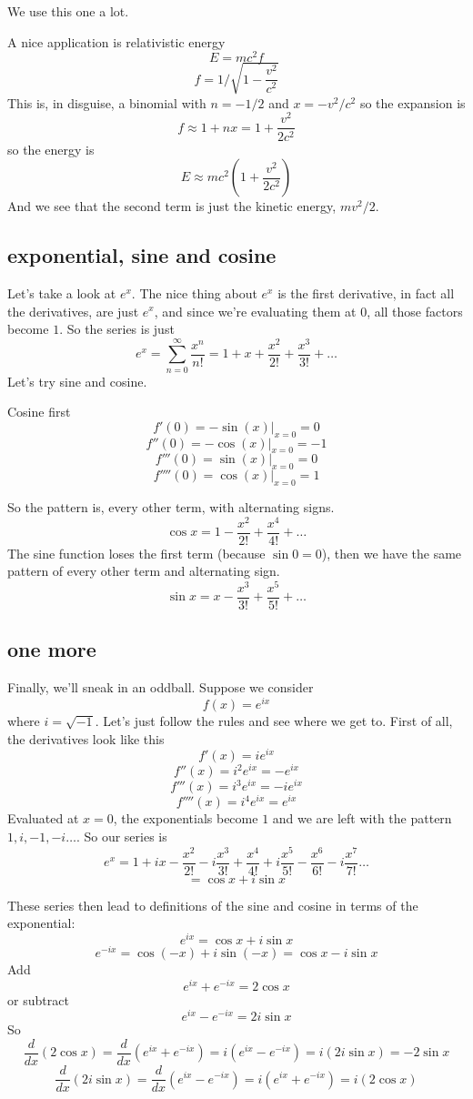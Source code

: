 \documentclass[11pt, oneside]{article}
\begin{document}
We use this one a lot.

A nice application is relativistic energy
\[ E = mc^2 f \]
\[ f =  1/\sqrt{1-\frac{v^2}{c^2}} \]
This is, in disguise, a binomial with $n=-1/2$ and $x=-v^2/c^2$ so the expansion is
\[ f  \approx 1 + nx = 1 + \frac{v^2}{2c^2} \]
so the energy is 
\[ E \approx mc^2 (1 + \frac{v^2}{2c^2} ) \]
And we see that the second term is just the kinetic energy, $mv^2/2$.

\subsection*{exponential, sine and cosine}
Let's take a look at $e^x$.  The nice thing about $e^x$ is the first derivative, in fact all the derivatives, are just $e^x$, and since we're evaluating them at $0$, all those factors become $1$.  So the series is just
\[ e^x = \sum_{n=0}^{\infty} \frac{x^n}{n!} = 1 + x + \frac{x^2}{2!} + \frac{x^3}{3!} + \dots \]
Let's try sine and cosine.  

Cosine first
\[ f'(0) = -\sin(x) \bigg |_{x=0} = 0 \]
\[ f''(0) = -\cos(x) \bigg |_{x=0} = -1 \]
\[ f'''(0) = \sin(x) \bigg |_{x=0} = 0 \]
\[ f''''(0) = \cos(x) \bigg |_{x=0} = 1 \]

So the pattern is, every other term, with alternating signs.
\[ \cos x = 1 - \frac{x^2}{2!} + \frac{x^4}{4!} + \dots \]
The sine function loses the first term (because $\sin 0 = 0$), then we have the same pattern of every other term and alternating sign.
\[ \sin x = x - \frac{x^3}{3!} + \frac{x^5}{5!} + \dots \]


\subsection*{one more}
Finally, we'll sneak in an oddball.  Suppose we consider
\[ f(x) = e^{ix} \]
where $i = \sqrt{-1}$.  Let's just follow the rules and see where we get to.  First of all, the derivatives look like this
\[ f'(x) = ie^{ix} \]
\[ f''(x) = i^2e^{ix} = -e^{ix} \]
\[ f'''(x) = i^3e^{ix} = -ie^{ix} \]
\[ f''''(x) = i^4e^{ix} = e^{ix} \]
Evaluated at $x=0$, the exponentials become $1$ and we are left with the pattern $1, i, -1, -i \dots$.  So our series is
\[ e^x = 1 + ix - \frac{x^2}{2!} - i\frac{x^3}{3!} + \frac{x^4}{4!} + i\frac{x^5}{5!} - \frac{x^6}{6!} - i \frac{x^7}{7!} \dots \]
\[ = \cos x + i \sin x \]

These series then lead to definitions of the sine and cosine in terms of the exponential:
\[ e^{ix} = \cos x + i \sin x \]
\[ e^{-ix} = \cos (-x) + i \sin (-x) = \cos x - i \sin x \]
Add
\[ e^{ix} + e^{-ix} = 2 \cos x  \]
or subtract
\[ e^{ix} - e^{-ix} = 2i \sin x \]
So
\[  \frac{d}{dx} (2 \cos x) = \frac{d}{dx} ( e^{ix} + e^{-ix}) = i( e^{ix} - e^{-ix}) = i(2i \sin x) = - 2 \sin x \]
\[  \frac{d}{dx} (2i \sin x) = \frac{d}{dx} ( e^{ix} - e^{-ix}) = i( e^{ix} + e^{-ix}) = i(2 \cos x) \]
\end{document}
